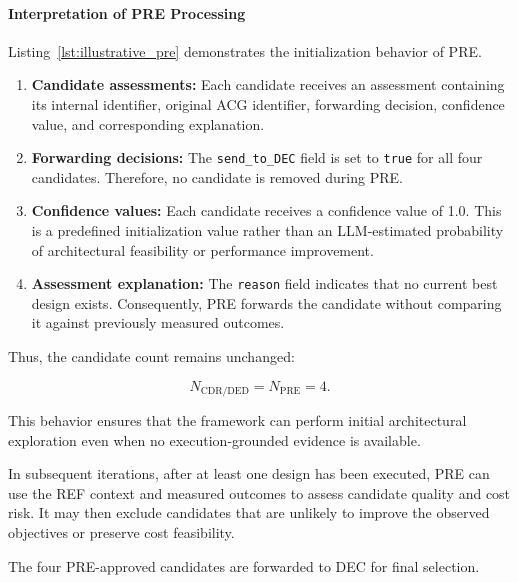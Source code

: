 \paragraph{Interpretation of PRE Processing}

Listing~\ref{lst:illustrative_pre}
demonstrates the initialization behavior
of PRE.

\begin{enumerate}

\item \textbf{Candidate assessments:}
Each candidate receives an assessment
containing its internal identifier,
original ACG identifier, forwarding
decision, confidence value, and
corresponding explanation.

\item \textbf{Forwarding decisions:}
The \texttt{send\_to\_DEC} field is
set to \texttt{true} for all four
candidates. Therefore, no candidate
is removed during PRE.

\item \textbf{Confidence values:}
Each candidate receives a confidence
value of 1.0. This is a predefined
initialization value rather than an
LLM-estimated probability of architectural
feasibility or performance improvement.

\item \textbf{Assessment explanation:}
The \texttt{reason} field indicates
that no current best design exists.
Consequently, PRE forwards the
candidate without comparing it
against previously measured outcomes.

\end{enumerate}

Thus, the candidate count remains unchanged:

\begin{equation}
N_{\mathrm{CDR/DED}}
=
N_{\mathrm{PRE}}
=
4.
\end{equation}

This behavior ensures that the framework
can perform initial architectural exploration
even when no execution-grounded evidence
is available.

In subsequent iterations, after at least
one design has been executed, PRE can
use the REF context and measured outcomes
to assess candidate quality and cost risk.
It may then exclude candidates that are
unlikely to improve the observed objectives
or preserve cost feasibility.

The four PRE-approved candidates are
forwarded to DEC for final selection.


